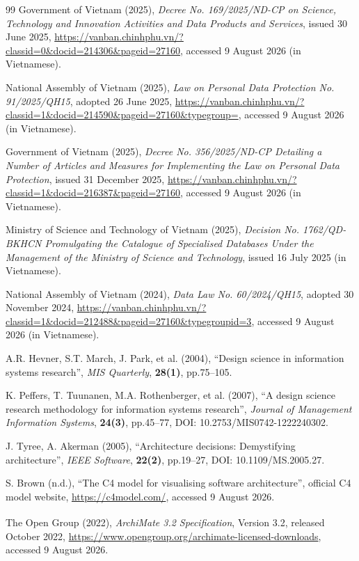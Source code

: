 \begin{thebibliography}{99}
Government of Vietnam (2025), \textit{Decree No. 169/2025/ND-CP on Science, Technology and Innovation Activities and Data Products and Services}, issued 30 June 2025, \url{https://vanban.chinhphu.vn/?classid=0&docid=214306&pageid=27160}, accessed 9 August 2026 (in Vietnamese).

National Assembly of Vietnam (2025), \textit{Law on Personal Data Protection No. 91/2025/QH15}, adopted 26 June 2025, \url{https://vanban.chinhphu.vn/?classid=1&docid=214590&pageid=27160&typegroup=}, accessed 9 August 2026 (in Vietnamese).

Government of Vietnam (2025), \textit{Decree No. 356/2025/ND-CP Detailing a Number of Articles and Measures for Implementing the Law on Personal Data Protection}, issued 31 December 2025, \url{https://vanban.chinhphu.vn/?classid=1&docid=216387&pageid=27160}, accessed 9 August 2026 (in Vietnamese).

Ministry of Science and Technology of Vietnam (2025), \textit{Decision No. 1762/QD-BKHCN Promulgating the Catalogue of Specialised Databases Under the Management of the Ministry of Science and Technology}, issued 16 July 2025 (in Vietnamese).

National Assembly of Vietnam (2024), \textit{Data Law No. 60/2024/QH15}, adopted 30 November 2024, \url{https://vanban.chinhphu.vn/?classid=1&docid=212488&pageid=27160&typegroupid=3}, accessed 9 August 2026 (in Vietnamese).

A.R. Hevner, S.T. March, J. Park, et al. (2004), ``Design science in information systems research'', \textit{MIS Quarterly}, \textbf{28(1)}, pp.75--105.

K. Peffers, T. Tuunanen, M.A. Rothenberger, et al. (2007), ``A design science research methodology for information systems research'', \textit{Journal of Management Information Systems}, \textbf{24(3)}, pp.45--77, DOI: 10.2753/MIS0742-1222240302.

J. Tyree, A. Akerman (2005), ``Architecture decisions: Demystifying architecture'',
\textit{IEEE Software}, \textbf{22(2)}, pp.19--27, DOI: 10.1109/MS.2005.27.

S. Brown (n.d.), ``The C4 model for visualising software architecture'', official C4 model website, \url{https://c4model.com/}, accessed 9 August 2026.

The Open Group (2022), \textit{ArchiMate\textsuperscript{\textregistered} 3.2 Specification}, Version 3.2, released October 2022, \url{https://www.opengroup.org/archimate-licensed-downloads}, accessed 9 August 2026.


\end{thebibliography}
